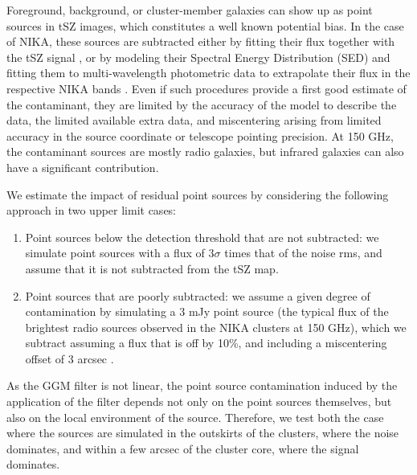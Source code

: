\documentclass[twocolumn,traditabstract]{aa}
\begin{document}
Foreground, background, or cluster-member galaxies can show up as point sources in tSZ images, which constitutes a well known potential bias. In the case of NIKA, these sources are subtracted either by fitting their flux together with the tSZ signal \citep{Adam2015}, or by modeling their Spectral Energy Distribution (SED) and fitting them to multi-wavelength photometric data to extrapolate their flux in the respective NIKA bands \citep[see the method detailed in][]{Adam2016a}. Even if such procedures provide a first good estimate of the contaminant, they are limited by the accuracy of the model to describe the data, the limited available extra data, and miscentering arising from limited accuracy in the source coordinate or telescope pointing precision. At 150 GHz, the contaminant sources are mostly radio galaxies, but infrared galaxies can also have a significant contribution.

We estimate the impact of residual point sources by considering the following approach in two upper limit cases:
\begin{enumerate} 
\item Point sources below the detection threshold that are not subtracted: we simulate point sources with a flux of $3 \sigma$ times that of the noise rms, and assume that it is not subtracted from the tSZ map. 
\item Point sources that are poorly subtracted: we assume a given degree of contamination by simulating a 3 mJy point source (the typical flux of the brightest radio sources observed in the NIKA clusters at 150 GHz), which we subtract assuming a flux that is off by 10\%, and including a miscentering offset of 3 arcsec \citep[the NIKA pointing accuracy for one scan][]{Catalano2014}.
\end{enumerate}
As the GGM filter is not linear, the point source contamination induced by the application of the filter depends not only on the point sources themselves, but also on the local environment of the source. Therefore, we test both the case where the sources are simulated in the outskirts of the clusters, where the noise dominates, and within a few arcsec of the cluster core, where the signal dominates.
\end{document}
